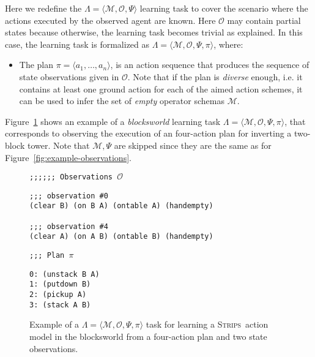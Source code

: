 \documentclass[3p,times]{elsarticle}
\newcommand{\strips}{\textsc{Strips}}     %
\newcommand{\tup}[1]{{\langle #1 \rangle}}
\begin{document}
Here we redefine the $\Lambda=\tup{\mathcal{M},\mathcal{O},\Psi}$ learning task to cover the scenario where the actions executed by the observed agent are known. Here $\mathcal{O}$ may contain partial states because otherwise, the learning task becomes trivial as explained. In this case, the learning task is formalized as $\Lambda=\tup{\mathcal{M},\mathcal{O},\Psi,\pi}$, where:
\begin{itemize}
\item The plan $\pi=\tup{a_1, \ldots, a_n}$, is an action sequence that produces the sequence of state observations given in $\mathcal{O}$. Note that if the plan is {\em diverse} enough, i.e. it contains at least one ground action for each of the aimed action schemes, it can be used to infer the set of {\em empty} operator schemas $\mathcal{M}$.
\end{itemize}

Figure~\ref{fig:example-plans} shows an example of a {\em blocksworld} learning task $\Lambda=\tup{\mathcal{M},\mathcal{O},\Psi,\pi}$, that corresponds to observing the execution of an four-action plan for inverting a two-block tower. Note that $\mathcal{M},\Psi$ are skipped since they are the same as for Figure~\ref{fig:example-observations}.

\begin{figure}[hbt!]
{\footnotesize\tt ;;;;;; Observations $\mathcal{O}$}
\begin{footnotesize}
\begin{verbatim}
;;; observation #0
(clear B) (on B A) (ontable A) (handempty)

;;; observation #4
(clear A) (on A B) (ontable B) (handempty)
\end{verbatim}
\end{footnotesize}
  
{\footnotesize\tt ;;; Plan $\pi$}
\begin{footnotesize}
\begin{verbatim}
0: (unstack B A)
1: (putdown B)
2: (pickup A)
3: (stack A B)
\end{verbatim}
\end{footnotesize}

 \caption{\small Example of a $\Lambda=\tup{\mathcal{M},\mathcal{O},\Psi,\pi}$ task for learning a \strips\ action model in the blocksworld from a four-action plan and two state observations.}
\label{fig:example-plans}
\end{figure}
\end{document}
